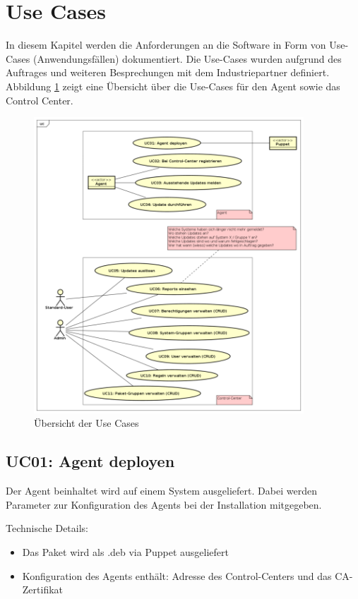\section{Use Cases}

In diesem Kapitel werden die Anforderungen an die Software in Form von Use-Cases (Anwendungsfällen) dokumentiert. Die Use-Cases wurden aufgrund des Auftrages und weiteren Besprechungen mit dem Industriepartner definiert. Abbildung \ref{fig:usecases} zeigt eine Übersicht über die Use-Cases für den Agent sowie das Control Center.


\begin{figure}
  \centering
    \includegraphics[width=0.9\textwidth]{files/UseCases_small}
  \caption{Übersicht der Use Cases}
  \label{fig:usecases}
\end{figure}

\subsection*{UC01: Agent deployen}
\label{sec:uc_01}

Der Agent beinhaltet wird auf einem System ausgeliefert. Dabei werden Parameter zur Konfiguration des Agents bei der Installation mitgegeben.


Technische Details:

\begin{itemize}
    \item Das Paket wird als .deb via Puppet ausgeliefert
    \item Konfiguration des Agents enthält: Adresse des Control-Centers und das CA-Zertifikat
\end{itemize}


